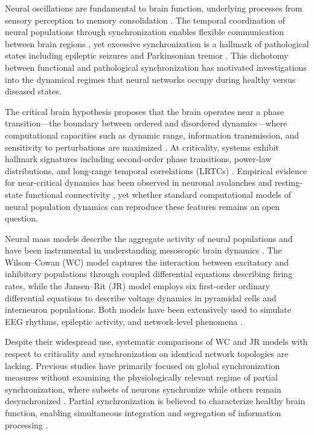 \documentclass[11pt]{article}
\begin{document}
Neural oscillations are fundamental to brain function, underlying processes from sensory perception to memory consolidation \citep{buzsaki2004neuronal}. The temporal coordination of neural populations through synchronization enables flexible communication between brain regions \citep{singer1999neuronal}, yet excessive synchronization is a hallmark of pathological states including epileptic seizures \citep{jiruska2013synchronization} and Parkinsonian tremor \citep{hammond2007pathological}. This dichotomy between functional and pathological synchronization has motivated investigations into the dynamical regimes that neural networks occupy during healthy versus diseased states.

The critical brain hypothesis proposes that the brain operates near a phase transition---the boundary between ordered and disordered dynamics---where computational capacities such as dynamic range, information transmission, and sensitivity to perturbations are maximized \citep{beggs2003neuronal, shew2013functional, chialvo2010emergent}. At criticality, systems exhibit hallmark signatures including second-order phase transitions, power-law distributions, and long-range temporal correlations (LRTCs) \citep{munoz2018colloquium}. Empirical evidence for near-critical dynamics has been observed in neuronal avalanches \citep{beggs2003neuronal} and resting-state functional connectivity \citep{haimovici2013brain}, yet whether standard computational models of neural population dynamics can reproduce these features remains an open question.

Neural mass models describe the aggregate activity of neural populations and have been instrumental in understanding mesoscopic brain dynamics \citep{breakspear2017dynamic, deco2008dynamic}. The Wilson--Cowan (WC) model \citep{wilson1972excitatory} captures the interaction between excitatory and inhibitory populations through coupled differential equations describing firing rates, while the Jansen--Rit (JR) model \citep{jansen1995electroencephalogram} employs six first-order ordinary differential equations to describe voltage dynamics in pyramidal cells and interneuron populations. Both models have been extensively used to simulate EEG rhythms, epileptic activity, and network-level phenomena \citep{david2003neural, wendling2002epileptic, destexhe2009wilson}.

Despite their widespread use, systematic comparisons of WC and JR models with respect to criticality and synchronization on identical network topologies are lacking. Previous studies have primarily focused on global synchronization measures without examining the physiologically relevant regime of partial synchronization, where subsets of neurons synchronize while others remain desynchronized \citep{pikovsky2001synchronization}. Partial synchronization is believed to characterize healthy brain function, enabling simultaneous integration and segregation of information processing \citep{cabral2014exploring}.
\end{document}
